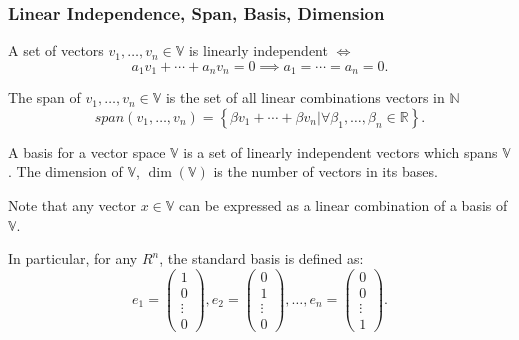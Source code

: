 \subsubsection{Linear Independence, Span, Basis, Dimension}
\begin{definition}
  A set of vectors $v_1,\ldots,v_n\in \mathbb{V}$ is linearly independent $\iff$
  \[a_1v_1+\cdots+a_{n}v_{n} = 0 \implies a_1=\cdots=a_{n}=0.\]
\end{definition}
\begin{definition}[Span]
  The span of $v_1,\ldots,v_{n}\in \mathbb{V}$ is the set of all linear
  combinations vectors in $\mathbb{N}$ 
  \[span(v_1,\ldots,v_{n})=\left\{ \beta v_1+\cdots+\beta v_{n} | \forall\beta_1,\ldots,\beta_{n}\in \mathbb{R} \right\}.\]
\end{definition}
\begin{definition}[Basis]
  A basis for a vector space $\mathbb{V}$ is a set of linearly independent
  vectors which spans $\mathbb{V}$. The dimension of $\mathbb{V}$,
  $\dim(\mathbb{V})$ is the number of vectors in its bases.
\end{definition}
Note that any vector $x\in \mathbb{V}$ can be expressed as a linear combination
of a basis of $\mathbb{V}$.
\begin{example}
  In particular, for any $R^{n}$, the standard basis is defined as:
  \[e_1=\begin{pmatrix} 1\\0\\\vdots\\0 \end{pmatrix},e_2=\begin{pmatrix} 0\\1\\\vdots\\0 \end{pmatrix} ,\ldots,e_{n}=\begin{pmatrix} 0\\0\\\vdots\\1 \end{pmatrix}.\]
\end{example}

